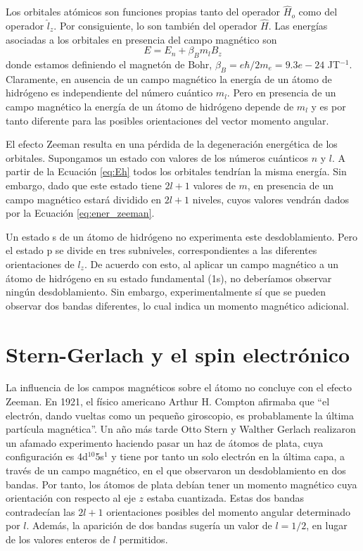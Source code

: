 \documentclass{tufte-handout}
\begin{document}
Los orbitales atómicos son funciones propias tanto del operador
$\hat{H}_o$ como del operador $\hat{l}_z$. Por consiguiente, 
lo son también del operador $\hat{H}$. Las energías asociadas
a los orbitales en presencia del campo magnético son
\begin{equation}
    E=E_n + \beta_Bm_lB_z \label{eq:ener_zeeman}
\end{equation}
donde estamos definiendo el magnetón de Bohr, 
$\beta_B=e\hbar/2m_e=9.3e-24$ JT$^{-1}$.
Claramente, en ausencia de un campo magnético la energía de un
átomo de hidrógeno es independiente del número cuántico $m_l$. 
Pero en presencia de un campo magnético la energía de un átomo de hidrógeno depende de $m_l$ y es por tanto diferente 
para las posibles orientaciones del vector momento angular. 

El efecto Zeeman resulta en una pérdida de la degeneración energética
de los orbitales. Supongamos un estado con valores de los números 
cuánticos $n$  y $l$. A partir de la Ecuación \ref{eq:Eh} todos los
orbitales tendrían la misma energía. Sin embargo, dado que este estado
tiene $2l+1$ valores de $m$, en presencia de un campo magnético estará 
dividido en $2l+1$ niveles, cuyos valores vendrán dados por la
Ecuación \ref{eq:ener_zeeman}.

Un estado s de un átomo de hidrógeno no experimenta este desdoblamiento.
Pero el estado p se divide en tres subniveles, correspondientes
a las diferentes orientaciones de $l_z$. De acuerdo con esto, al aplicar 
un campo magnético a un átomo de hidrógeno en su estado fundamental (1s), 
no deberíamos observar ningún desdoblamiento. Sin embargo, experimentalmente
sí que se pueden observar dos bandas diferentes, lo cual indica un momento
magnético adicional.

\section{Stern-Gerlach y el spin electrónico}
La influencia de los campos magnéticos sobre el átomo no concluye 
con el efecto Zeeman. En 1921, el físico americano Arthur H. Compton
afirmaba que ``el electrón, dando vueltas como un pequeño giroscopio,
es probablamente la última partícula magnética''.
Un año más tarde Otto Stern y Walther Gerlach realizaron un afamado
experimento haciendo pasar un 
haz de átomos de plata, cuya configuración es 4d$^{10}$5s$^1$ y tiene
por tanto un solo electrón en la última capa,
a través de un campo magnético, en el que observaron
un desdoblamiento en dos bandas. Por tanto, los átomos de plata 
debían tener un momento
magnético cuya orientación con respecto al eje $z$ estaba cuantizada. 
Estas dos bandas contradecían las $2l+1$ orientaciones posibles del
momento angular determinado por $l$. Además, la aparición de dos 
bandas sugería un valor de $l=1/2$, en lugar de los valores 
enteros de $l$ permitidos.
\end{document}
